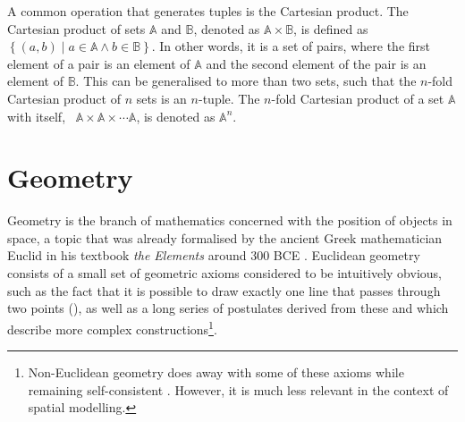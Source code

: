 A common operation that generates tuples is the Cartesian product.
The Cartesian product of sets $\mathbb{A}$ and $\mathbb{B}$, denoted as $\mathbb{A} \times \mathbb{B}$, is defined as $\left\{ (a,b) \mid a \in \mathbb{A} \wedge b \in \mathbb{B} \right\}$.
In other words, it is a set of pairs, where the first element of a pair is an element of $\mathbb{A}$ and the second element of the pair is an element of $\mathbb{B}$.
This can be generalised to more than two sets, such that the $n$-fold Cartesian product of $n$ sets is an $n$-tuple.
The $n$-fold Cartesian product of a set $\mathbb{A}$ with itself, \ie\ $\mathbb{A} \times \mathbb{A} \times \cdots \mathbb{A}$, is denoted as $\mathbb{A}^n$.

\section{Geometry}
\label{se:geometry}

Geometry is the branch of mathematics concerned with the position of objects in space, a topic that was already formalised by the ancient Greek mathematician Euclid in his textbook \emph{the Elements} around 300 BCE \citep{Fitzpatrick08}.
Euclidean geometry consists of a small set of geometric axioms considered to be intuitively obvious, such as the fact that it is possible to draw exactly one line that passes through two points (), as well as a long series of postulates derived from these and which describe more complex constructions\footnote{Non-Euclidean geometry does away with some of these axioms while remaining self-consistent \citep{Bolyai32,Lobachevsky40}. However, it is much less relevant in the context of spatial modelling.}.

